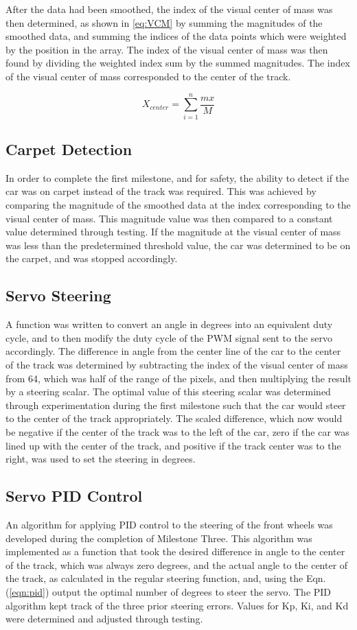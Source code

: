 \documentclass{article}
\begin{document}
After the data had been smoothed, the index of the visual center of mass was then determined, as shown in \ref{eq:VCM} by summing the magnitudes of the smoothed data, and summing the indices of the data points which were weighted by the position in the array. The index of the visual center of mass was then found by dividing the weighted index sum by the summed magnitudes. The index of the visual center of mass corresponded to the center of the track.

\begin{equation}
    X_{center} = \sum_{i=1}^{n} \frac{mx}{M} \label{eq:VCM}
\end{equation}

\subsection{Carpet Detection}
In order to complete the first milestone, and for safety, the ability to detect if the car was on carpet instead of the track was required. This was achieved by comparing the magnitude of the smoothed data at the index corresponding to the visual center of mass. This magnitude value was then compared to a constant value determined through testing. If the magnitude at the visual center of mass was less than the predetermined threshold value, the car was determined to be on the carpet, and was stopped accordingly. 

\subsection{Servo Steering}
A function was written to convert an angle in degrees into an equivalent duty cycle, and to then modify the duty cycle of the PWM signal sent to the servo accordingly.
The difference in angle from the center line of the car to the center of the track was determined by subtracting the index of the visual center of mass from 64, which was half of the range of the pixels, and then multiplying the result by a steering scalar. The optimal value of this steering scalar was determined through experimentation during the first milestone such that the car would steer to the center of the track appropriately. The scaled difference, which now would be negative if the center of the track was to the left of the car, zero if the car was lined up with the center of the track, and positive if the track center was to the right, was used to set the steering in degrees. 

\subsection{Servo PID Control}
An algorithm for applying PID control to the steering of the front wheels was developed during the completion of Milestone Three. This algorithm was implemented as a function that took the desired difference in angle to the center of the track, which was always zero degrees, and the actual angle to the center of the track, as calculated in the regular steering function, and, using the Eqn. (\ref{eqn:pid}) output the optimal number of degrees to steer the servo. The PID algorithm kept track of the three prior steering errors. Values for Kp, Ki, and Kd were determined and adjusted through testing. 
\end{document}

